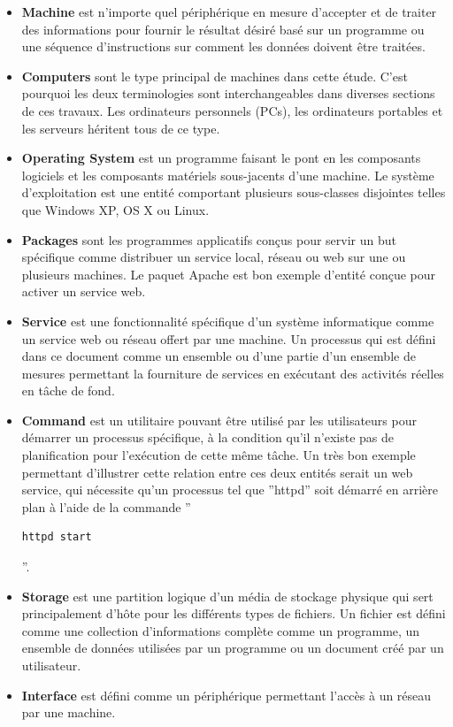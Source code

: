 \begin{itemize}
  \item \textbf{Machine} est n'importe quel périphérique en mesure d'accepter et
	  de traiter des informations pour fournir le résultat désiré basé sur
	  un programme ou une séquence d'instructions sur comment les données
	  doivent être traitées.
  \item \textbf{Computers} sont le type principal de machines dans cette étude.
	  C'est pourquoi les deux terminologies sont interchangeables dans
	  diverses sections de ces travaux. Les ordinateurs personnels (PCs),
	  les ordinateurs portables et les serveurs héritent tous de ce type.
  \item \textbf{Operating System} est un programme faisant le pont en les
	  composants logiciels et les composants matériels sous-jacents d'une
	  machine. Le système d'exploitation est une entité comportant plusieurs
	  sous-classes disjointes telles que Windows XP, OS X ou Linux.
  \item \textbf{Packages} sont les programmes applicatifs conçus pour servir un
	  but spécifique comme distribuer un service local, réseau ou web sur
      une ou plusieurs machines. Le paquet Apache est bon exemple d'entité
      conçue pour activer un service web.
  \item \textbf{Service} est une fonctionnalité spécifique d'un système
	  informatique comme un service web ou réseau offert par une machine. Un
	  processus qui est défini dans ce document comme un ensemble ou d'une
	  partie d'un ensemble de mesures permettant la fourniture de services
	  en exécutant des activités réelles en tâche de fond.
  \item \textbf{Command} est un utilitaire pouvant être utilisé par les
	  utilisateurs pour démarrer un processus spécifique, à la condition
	  qu'il n'existe pas de planification pour l'exécution de cette même
	  tâche. Un très bon exemple permettant d'illustrer cette relation
	  entre ces deux entités serait un web service, qui nécessite qu'un
	  processus tel que ''httpd'' soit démarré en arrière plan à l'aide de
	  la commande ''\begin{verbatim}httpd start\end{verbatim}''.
  \item \textbf{Storage} est une partition logique d'un média de stockage
	  physique qui sert principalement d'hôte pour les différents types de
	  fichiers. Un fichier est défini comme une collection d'informations
	  complète comme un programme, un ensemble de données utilisées par un
	  programme ou un document créé par un utilisateur.
  \item \textbf{Interface} est défini comme un périphérique permettant l'accès à
	  un réseau par une machine.
\end{itemize}

